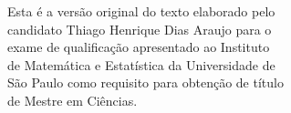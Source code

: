 \documentclass[11pt,twoside,a4paper]{book}
\begin{document}
    \vskip 2cm

    \begin{flushright}
	Esta é a versão original do texto elaborado pelo\\
	candidato Thiago Henrique Dias Araujo para o\\
  exame de qualificação apresentado ao Instituto\\
  de Matemática e Estatística da Universidade de\\
  São Paulo como requisito para obtenção de título\\
  de Mestre em Ciências.
    \end{flushright}

\pagebreak


%
%
%
%
%
%
%
%
%
%
\end{document}
